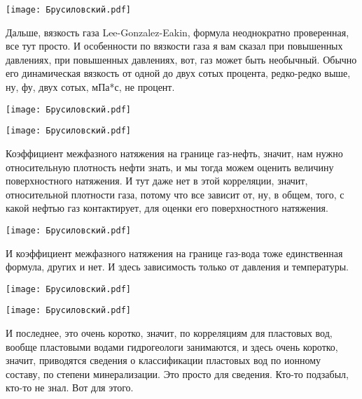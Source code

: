 \documentclass[main.tex]{subfiles}
\begin{document}
\begin{center}
\texttt{[image: Брусиловский.pdf]}
\end{center}

Дальше, вязкость газа Lee-Gonzalez-Eakin, формула неоднократно проверенная, все тут просто.
И особенности по вязкости газа я вам сказал при повышенных давлениях, при повышенных давлениях, вот, газ может быть необычный.
Обычно его динамическая вязкость от одной до двух сотых процента, редко-редко выше, ну, фу, двух сотых, мПа*с, не процент.

\begin{center}
\texttt{[image: Брусиловский.pdf]}
\end{center}



\begin{center}
\texttt{[image: Брусиловский.pdf]}
\end{center}

Коэффициент межфазного натяжения на границе газ-нефть, значит, нам нужно относительную плотность нефти знать, и мы тогда можем оценить величину поверхностного натяжения.
И тут даже нет в этой корреляции, значит, относительной плотности газа, потому что все зависит от, ну, в общем, того, с какой нефтью газ контактирует, для оценки его поверхностного натяжения.

\begin{center}
\texttt{[image: Брусиловский.pdf]}
\end{center}

И коэффициент межфазного натяжения на границе газ-вода тоже единственная формула, других и нет.
И здесь зависимость только от давления и температуры.

\begin{center}
\texttt{[image: Брусиловский.pdf]}
\end{center}



\begin{center}
\texttt{[image: Брусиловский.pdf]}
\end{center}

И последнее, это очень коротко, значит, по корреляциям для пластовых вод, вообще пластовыми водами гидрогеологи занимаются, и здесь очень коротко, значит, приводятся сведения о классификации пластовых вод по ионному составу, по степени минерализации.
Это просто для сведения.
Кто-то подзабыл, кто-то не знал.
Вот для этого.
\end{document}
